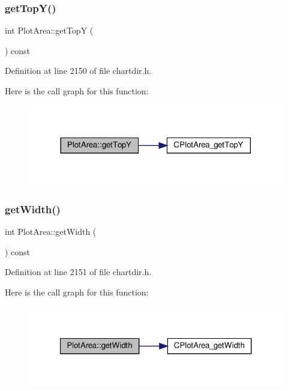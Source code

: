 \subsubsection{\texorpdfstring{get\+Top\+Y()}{getTopY()}}
{\footnotesize\ttfamily int Plot\+Area\+::get\+TopY (\begin{DoxyParamCaption}{ }\end{DoxyParamCaption}) const\hspace{0.3cm}{\ttfamily [inline]}}



Definition at line 2150 of file chartdir.\+h.

Here is the call graph for this function\+:
\nopagebreak
\begin{figure}[H]
\begin{center}
\leavevmode
\includegraphics[width=317pt]{class_plot_area_aef78dfa0ea0f6ca79ae233de69d4478b_cgraph}
\end{center}
\end{figure}
\mbox{\label{class_plot_area_a9d7e77031904a16adc9eafa7576a613f}} 
\subsubsection{\texorpdfstring{get\+Width()}{getWidth()}}
{\footnotesize\ttfamily int Plot\+Area\+::get\+Width (\begin{DoxyParamCaption}{ }\end{DoxyParamCaption}) const\hspace{0.3cm}{\ttfamily [inline]}}



Definition at line 2151 of file chartdir.\+h.

Here is the call graph for this function\+:
\nopagebreak
\begin{figure}[H]
\begin{center}
\leavevmode
\includegraphics[width=321pt]{class_plot_area_a9d7e77031904a16adc9eafa7576a613f_cgraph}
\end{center}
\end{figure}
\mbox{\label{class_plot_area_ac00dbf72a76b6c88f3edbe1f74c21550}} 
